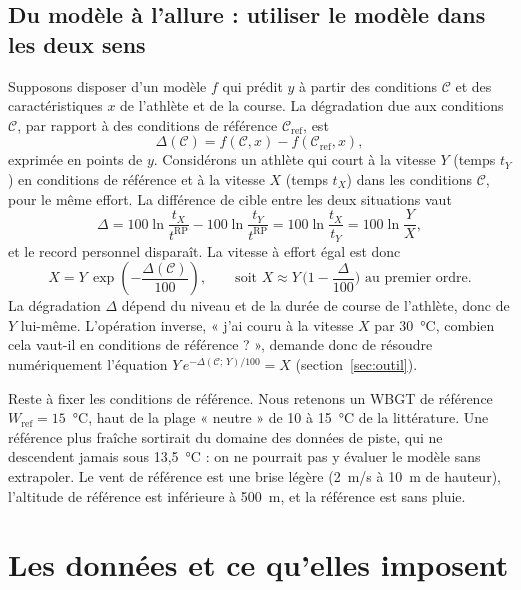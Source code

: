 \documentclass[11pt,a4paper]{article}
\newcommand{\RP}{\mathrm{RP}}
\begin{document}
\subsection{Du modèle à l'allure : utiliser le modèle dans les deux sens}\label{sec:deux_sens}

Supposons disposer d'un modèle $f$ qui prédit $y$ à partir des conditions $\mathcal{C}$ et des caractéristiques $x$
de l'athlète et de la course. La dégradation due aux conditions $\mathcal{C}$, par rapport à des conditions de
référence $\mathcal{C}_{\text{ref}}$, est
\begin{equation}\label{eq:degradation}
\Delta(\mathcal{C}) = f(\mathcal{C}, x) - f(\mathcal{C}_{\text{ref}}, x),
\end{equation}
exprimée en points de $y$. Considérons un athlète qui court à la vitesse $Y$ (temps $t_Y$) en conditions de référence
et à la vitesse $X$ (temps $t_X$) dans les conditions $\mathcal{C}$, pour le même effort. La différence de cible entre
les deux situations vaut
\[
\Delta = 100\ln\frac{t_X}{t^{\RP}} - 100\ln\frac{t_Y}{t^{\RP}} = 100\ln\frac{t_X}{t_Y} = 100\ln\frac{Y}{X},
\]
et le record personnel disparaît. La vitesse à effort égal est donc
\begin{equation}\label{eq:conversion}
X = Y\,\exp\!\left(-\frac{\Delta(\mathcal{C})}{100}\right),
\qquad\text{soit } X \approx Y\,\Big(1 - \frac{\Delta}{100}\Big) \text{ au premier ordre.}
\end{equation}
La dégradation $\Delta$ dépend du niveau et de la durée de course de l'athlète, donc de $Y$ lui-même. L'opération
inverse, « j'ai couru à la vitesse $X$ par 30~°C, combien cela vaut-il en conditions de référence ? », demande donc
de résoudre numériquement l'équation $Y\,e^{-\Delta(\mathcal{C};\,Y)/100} = X$ (section~\ref{sec:outil}).

Reste à fixer les conditions de référence. Nous retenons un WBGT de référence $W_{\text{ref}} = 15$~°C, haut de la
plage « neutre » de 10 à 15~°C de la littérature. Une référence plus fraîche sortirait du domaine des données de
piste, qui ne descendent jamais sous 13,5~°C : on ne pourrait pas y évaluer le modèle sans extrapoler. Le vent de
référence est une brise légère (2~m/s à 10~m de hauteur), l'altitude de référence est inférieure à 500~m, et la
référence est sans pluie.

\section{Les données et ce qu'elles imposent}\label{sec:donnees}
\end{document}
